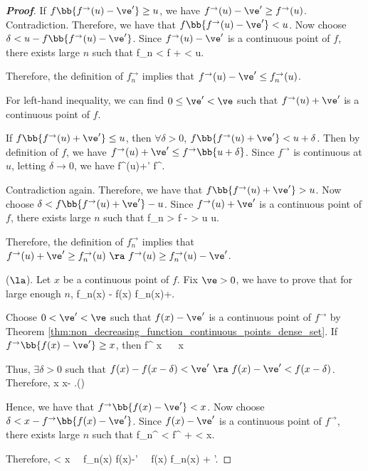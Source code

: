 \begin{proof}[\bf Proof]
If $f\bb{f^{\to }(u)-\ve'} \geq u$, we have $f^{\to}(u)-\ve' \geq f^{\to}(u)$. Contradiction. Therefore, we have that $f\bb{f^{\to}(u)-\ve'} < u$. Now choose $\delta < u - f\bb{f^{\to}(u)-\ve'}$. Since $f^{\to}(u)-\ve'$ is a continuous point of $f$, there exists large $n$ such that
\be
f_n < f + \delta < u.
\ee

Therefore, the definition of $f_n^{\to}$ implies that $f^{\to}(u)-\ve' \leq f_n^{\to}(u)$.


For left-hand inequality, we can find $0\leq \ve'< \ve$ such that $f^{\to}(u)+\ve'$ is a continuous point of $f$.

If $f\bb{f^{\to }(u)+\ve'} \leq u$, then $\forall \delta >0$, $f\bb{f^{\to }(u)+\ve'} < u + \delta$. Then by definition of $f$, we have $f^{\to }(u)+\ve' \leq f^{\to}\bb{u + \delta}$. Since $f^{\to}$ is continuous at $u$, letting $\delta \to 0$, we have
\be
f^{\to }(u)+\ve' \leq f^{\to}.
\ee

Contradiction again. Therefore, we have that $f\bb{f^{\to}(u)+\ve'} > u$. Now choose $\delta < f\bb{f^{\to}(u)+\ve'}-u$. Since $f^{\to}(u)+\ve'$ is a continuous point of $f$, there exists large $n$ such that
\be
f_n > f - \delta > u \geq u.
\ee

Therefore, the definition of $f_n^{\to}$ implies that $f^{\to}(u)+\ve' \geq f_n^{\to}(u) \ \ra\ f^{\to}(u) \geq f_n^{\to}(u) - \ve'$.


($\la$). Let $x$ be a continuous point of $f$. Fix $\ve >0$, we have to prove that for large enough $n$,
\be
f_n(x) - \ve \leq f(x) \leq f_n(x)+\ve.
\ee

Choose $0<\ve'<\ve$ such that $f(x)-\ve'$ is a continuous point of $f^{\to}$ by Theorem \ref{thm:non_decreasing_function_continuous_points_dense_set}. If $f^{\to}\bb{f(x)-\ve'} \geq x$, then
\be
f^{\to} \geq x \ \ra\ \inf{} \geq x
\ee

Thus, $\exists \delta >0$ such that $f(x) - f(x-\delta)< \ve' \ \ra \ f(x)-\ve' < f(x-\delta)$. Therefore,
\be
x\leq \inf{} \leq x- \delta.\qquad ()
\ee

Hence, we have that $f^{\to}\bb{f(x)-\ve'} < x$. Now choose $\delta < x - f^{\to}\bb{f(x)-\ve'}$. Since $f(x)-\ve'$ is a continuous point of $f^{\to}$, there exists large $n$ such that
\be
f_n^{\to} < f^{\to} + \delta < x.
\ee

Therefore,
\be
\inf{} < x \ \ra\  f_n(x) \geq f(x)-\ve' \ \ra\ f(x) \leq f_n(x) + \ve'.
\ee



\end{proof}
